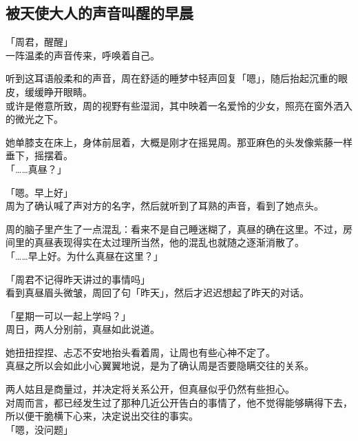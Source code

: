 \subsection{被天使大人的声音叫醒的早晨}

「周君，醒醒」\\

一阵温柔的声音传来，呼唤着自己。

听到这耳语般柔和的声音，周在舒适的睡梦中轻声回复「嗯」，随后抬起沉重的眼皮，缓缓睁开眼睛。\\

或许是倦意所致，周的视野有些湿润，其中映着一名爱怜的少女，照亮在窗外洒入的微光之下。

她单膝支在床上，身体前屈着，大概是刚才在摇晃周。那亚麻色的头发像紫藤一样垂下，摇摆着。\\

「……真昼？」

「嗯。早上好」\\

周为了确认喊了声对方的名字，然后就听到了耳熟的声音，看到了她点头。

周的脑子里产生了一点混乱：看来不是自己睡迷糊了，真昼的确在这里。不过，房间里的真昼表现得实在太过理所当然，他的混乱也就随之逐渐消散了。\\

「……早上好。为什么真昼在这里？」

「周君不记得昨天讲过的事情吗」\\

看到真昼眉头微皱，周回了句「昨天」，然后才迟迟想起了昨天的对话。\\

\vspace{2\baselineskip}

「星期一可以一起上学吗？」\\

周日，两人分别前，真昼如此说道。

她扭扭捏捏、忐忑不安地抬头看着周，让周也有些心神不定了。\\

真昼之所以会如此小心翼翼地说，是为了确认周是否要隐瞒交往的关系。

两人姑且是商量过，并决定将关系公开，但真昼似乎仍然有些担心。\\

对周而言，都已经发生过了那种几近公开告白的事情了，他不觉得能够瞒得下去，所以便干脆横下心来，决定说出交往的事实。\\

「嗯，没问题」

